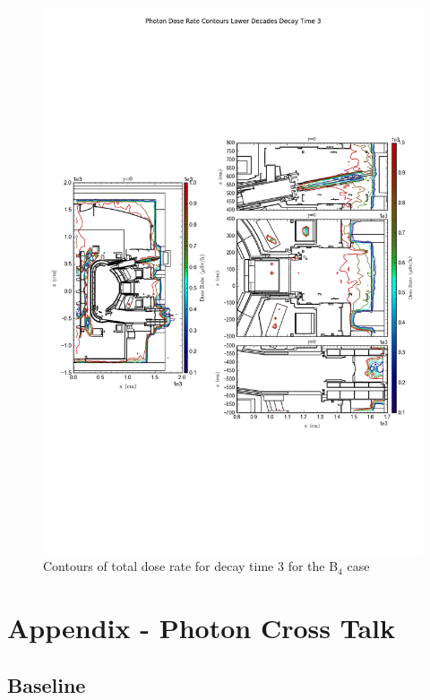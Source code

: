 \documentclass[12pt]{article}
\begin{document}
\begin{figure}[ht!]
\centering
\includegraphics[trim={0cm 8cm, 0cm 8cm},clip,scale=0.75]{../plots/final_model_with_b4c/Photon_Dose_Rate_Contours_Lower_Decades_Decay_Time_3.png}
\caption{Contours of total dose rate for decay time 3 for the B$_4$ case}
\label{fig:photons_dc3_b4c_contours_l}
\end{figure}

\newpage
\clearpage
\section{Appendix - Photon Cross Talk}
\label{cross_talk_data}
\subsection{Baseline}
\end{document}
